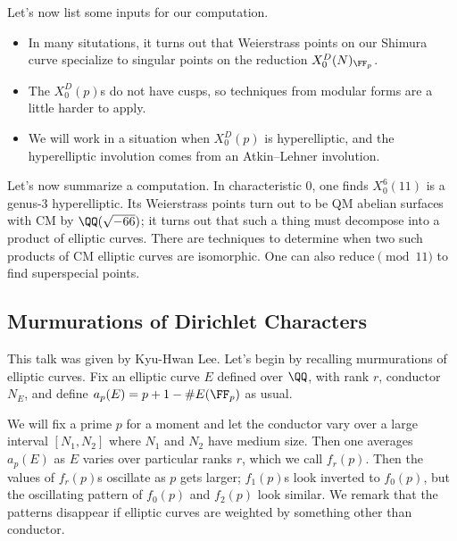 \documentclass{article}
\begin{document}
Let's now list some inputs for our computation.
\begin{itemize}
	\item In many situtations, it turns out that Weierstrass points on our Shimura curve specialize to singular points on the reduction $X_0^D(N)_{\FF_p}$.
	\item The $X_0^D(p)$s do not have cusps, so techniques from modular forms are a little harder to apply.
	\item We will work in a situation when $X_0^D(p)$ is hyperelliptic, and the hyperelliptic involution comes from an Atkin--Lehner involution.
\end{itemize}
Let's now summarize a computation. In characteristic $0$, one finds $X_0^6(11)$ is a genus-$3$ hyperelliptic. Its Weierstrass points turn out to be QM abelian surfaces with CM by $\QQ(\sqrt{-66})$; it turns out that such a thing must decompose into a product of elliptic curves. There are techniques to determine when two such products of CM elliptic curves are isomorphic. One can also reduce$\pmod{11}$ to find superspecial points.

\subsection{Murmurations of Dirichlet Characters}
This talk was given by Kyu-Hwan Lee. Let's begin by recalling murmurations of elliptic curves. Fix an elliptic curve $E$ defined over $\QQ$, with rank $r$, conductor $N_E$, and define $a_p(E)=p+1-\#E(\FF_p)$ as usual.

We will fix a prime $p$ for a moment and let the conductor vary over a large interval $[N_1,N_2]$ where $N_1$ and $N_2$ have medium size. Then one averages $a_p(E)$ as $E$ varies over particular ranks $r$, which we call $f_r(p)$. Then the values of $f_r(p)$s oscillate as $p$ gets larger; $f_1(p)$s look inverted to $f_0(p)$, but the oscillating pattern of $f_0(p)$ and $f_2(p)$ look similar. We remark that the patterns disappear if elliptic curves are weighted by something other than conductor.
\end{document}
